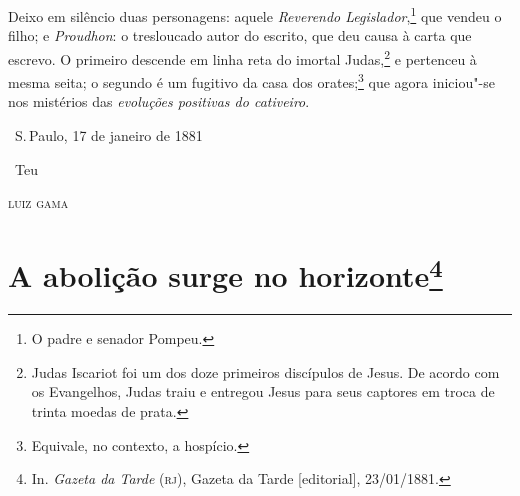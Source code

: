 \asterisc

Deixo em silêncio duas personagens: aquele \emph{Reverendo
Legislador},\footnote{O padre e senador Pompeu.} que vendeu o filho; e
\emph{Proudhon}: o tresloucado autor do escrito, que deu causa à carta
que escrevo. O primeiro descende em linha reta do imortal
Judas,\footnote{Judas Iscariot foi um dos doze primeiros discípulos de
  Jesus. De acordo com os Evangelhos, Judas traiu e entregou Jesus para
  seus captores em troca de trinta moedas de prata.} e pertenceu à
mesma seita; o segundo é um fugitivo da casa dos orates;\footnote{
  Equivale, no contexto, a hospício.} que agora iniciou"-se nos
mistérios das \emph{evoluções positivas do cativeiro}.


\hfill\ S.\,Paulo, 17 de janeiro de 1881\smallskip

\hfill\ Teu

\hfill\textsc{luiz gama}

\chapter{A abolição surge no horizonte\footnote[*]{In.
  \emph{Gazeta da Tarde} (\textsc{rj}), Gazeta da Tarde {[}editorial{]},
  23/01/1881.}}

